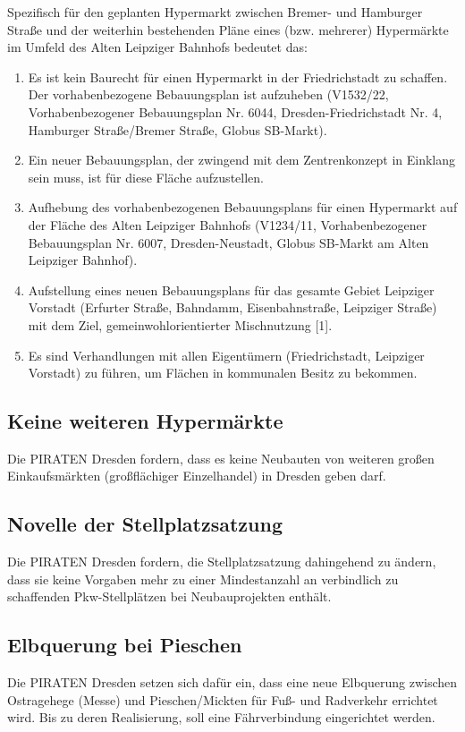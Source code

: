 \documentclass[a4paper, 11pt]{article}
\begin{document}
Spezifisch für den geplanten Hypermarkt zwischen Bremer- und Hamburger Straße und der weiterhin bestehenden Pläne eines (bzw. mehrerer) Hypermärkte im Umfeld des Alten Leipziger Bahnhofs bedeutet das:

\begin{enumerate}

\item Es ist kein Baurecht für einen Hypermarkt in der Friedrichstadt zu schaffen. Der vorhabenbezogene Bebauungsplan ist aufzuheben (V1532/22, Vorhabenbezogener Bebauungsplan Nr. 6044, Dresden-Friedrichstadt Nr. 4, Hamburger Straße/Bremer Straße, Globus SB-Markt).
\item Ein neuer Bebauungsplan, der zwingend mit dem Zentrenkonzept in Einklang sein muss, ist für diese Fläche aufzustellen.
\item Aufhebung des vorhabenbezogenen Bebauungsplans für einen Hypermarkt auf der Fläche des Alten Leipziger Bahnhofs (V1234/11, Vorhabenbezogener Bebauungsplan Nr. 6007, Dresden-Neustadt, Globus SB-Markt am Alten Leipziger Bahnhof).
\item Aufstellung eines neuen Bebauungsplans für das gesamte Gebiet Leipziger Vorstadt (Erfurter Straße, Bahndamm, Eisenbahnstraße, Leipziger Straße) mit dem Ziel, gemeinwohlorientierter Mischnutzung [1].
\item Es sind Verhandlungen mit allen Eigentümern (Friedrichstadt, Leipziger Vorstadt) zu führen, um Flächen in kommunalen Besitz zu bekommen.
\end{enumerate}


\subsection{Keine weiteren Hypermärkte}
Die PIRATEN Dresden fordern, dass es keine Neubauten von weiteren großen Einkaufsmärkten (großflächiger Einzelhandel) in Dresden geben darf.

\subsection{Novelle der Stellplatzsatzung}
Die PIRATEN Dresden fordern, die Stellplatzsatzung dahingehend zu ändern, dass sie keine Vorgaben mehr zu einer Mindestanzahl an verbindlich zu schaffenden Pkw-Stellplätzen bei Neubauprojekten enthält.



\subsection{Elbquerung bei Pieschen}
Die PIRATEN Dresden setzen sich dafür ein, dass eine neue Elbquerung zwischen Ostragehege (Messe) und Pieschen/Mickten für Fuß- und Radverkehr errichtet wird. Bis zu deren Realisierung, soll eine Fährverbindung eingerichtet werden.
\end{document}
